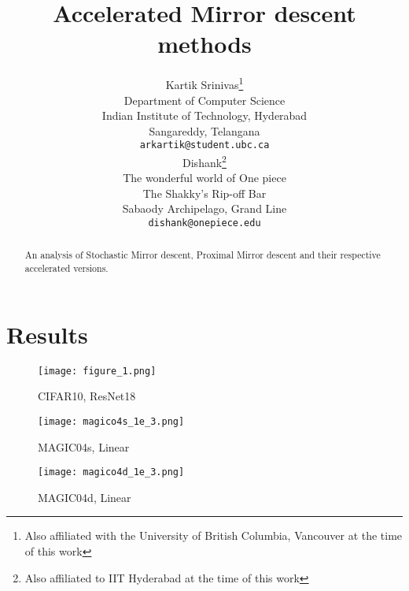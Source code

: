 \documentclass{article}
\title{Accelerated Mirror descent methods}
\author{%
    Kartik Srinivas\thanks{Also affiliated with the University of British Columbia, Vancouver at the time of this work} \\
  Department of Computer Science\\
  Indian Institute of Technology, Hyderabad\\
  Sangareddy, Telangana\\
  \texttt{arkartik@student.ubc.ca} \\
  \And
  Dishank\thanks{Also affiliated to IIT Hyderabad at the time of this work} \\
  The wonderful world of One piece \\
  The Shakky's Rip-off Bar \\
  Sabaody Archipelago, Grand Line \\
  \texttt{dishank@onepiece.edu} \\
}
\begin{document}
\maketitle


\begin{abstract}
    An analysis of Stochastic Mirror descent, Proximal Mirror descent and their respective accelerated versions.
\end{abstract}


% 


\section{Results}
\begin{figure}[h]
    \centering
    \texttt{[image: figure\_1.png]}
    \caption{CIFAR10, ResNet18}
\end{figure}    

\begin{figure}[h]
    \centering
    \texttt{[image: magico4s\_1e\_3.png]}
    \caption{MAGIC04s, Linear}
\end{figure}    

\begin{figure}[h]
    \centering
    \texttt{[image: magico4d\_1e\_3.png]}
    \caption{MAGIC04d, Linear}
\end{figure}   
\end{document}
